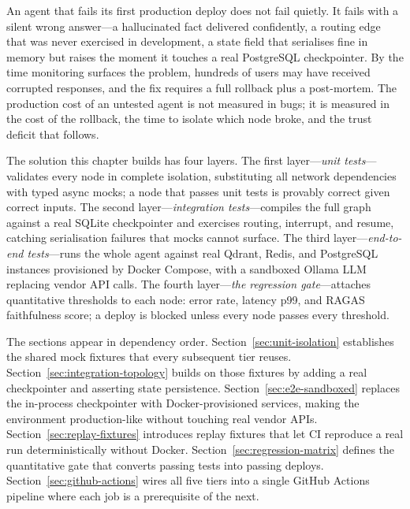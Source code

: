 


An agent that fails its first production deploy does not fail quietly.
It fails with a silent wrong answer---a hallucinated fact delivered
confidently, a routing edge that was never exercised in development, a
state field that serialises fine in memory but raises 
the moment it touches a real PostgreSQL checkpointer.
By the time monitoring surfaces the problem, hundreds of users may have
received corrupted responses, and the fix requires a full rollback plus
a post-mortem.
The production cost of an untested agent is not measured in bugs; it is
measured in the cost of the rollback, the time to isolate which node
broke, and the trust deficit that follows.

The solution this chapter builds has four layers.
The first layer---\emph{unit tests}---validates every node in complete
isolation, substituting all network dependencies with typed async mocks;
a node that passes unit tests is provably correct given correct inputs.
The second layer---\emph{integration tests}---compiles the full graph
against a real SQLite checkpointer and exercises routing, interrupt, and
resume, catching serialisation failures that mocks cannot surface.
The third layer---\emph{end-to-end tests}---runs the whole agent against
real Qdrant, Redis, and PostgreSQL instances provisioned by Docker
Compose, with a sandboxed Ollama LLM replacing vendor API calls.
The fourth layer---\emph{the regression gate}---attaches quantitative
thresholds to each node: error rate, latency p99, and RAGAS faithfulness
score; a deploy is blocked unless every node passes every threshold.

The sections appear in dependency order.
Section~\ref{sec:unit-isolation} establishes the shared mock fixtures
that every subsequent tier reuses.
Section~\ref{sec:integration-topology} builds on those fixtures by
adding a real checkpointer and asserting state persistence.
Section~\ref{sec:e2e-sandboxed} replaces the in-process checkpointer
with Docker-provisioned services, making the environment production-like
without touching real vendor APIs.
Section~\ref{sec:replay-fixtures} introduces replay fixtures that let
CI reproduce a real run deterministically without Docker.
Section~\ref{sec:regression-matrix} defines the quantitative gate that
converts passing tests into passing deploys.
Section~\ref{sec:github-actions} wires all five tiers into a single
GitHub Actions pipeline where each job is a prerequisite of the next.

